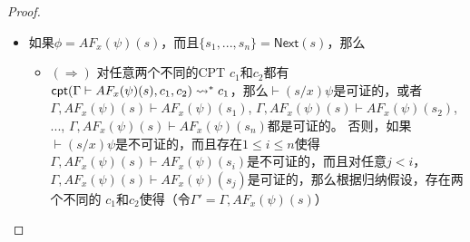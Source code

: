 {\begin{proof}
\begin{itemize}
\begin{itemize}
			$\textsf{cpt}(\vdash
			EX_x(\psi)(s), c_1, c_2)\rsa \\ 
			\textsf{cpt}(\vdash \psi_{s_1}, c_1,
			\textsf{cpt}(...\textsf{cpt}(\vdash\psi_{s_n}, c_1,
			c_2)...))\rsa^* \\ 
			\ldots \rsa^*\\
			\textsf{cpt}(\vdash\psi_{s_n}, c_1, c_2)\not\rsa^* c_1$。因此，由证明系统的规则可知，$\vdash EX_x(\psi)(s)$是可证的。
			\item $(\Leftarrow)$ 如果$\vdash EX_x(\psi)(s)$是可证的，那么由证明系统的规则可知，存在$1\le i\le n$使得$\vdash (s_i/x)\psi$是可证的。根据归纳假设，对任意两个不同的\textsf{CPT} $c_1$和$c_2$都有（我们用$\vdash\psi_{s_i}$表示$\vdash(s_i/x)\psi$） 
			
			$\textsf{cpt}(\vdash EX_x(\psi)(s), c_1, c_2)\rsa \\ 
			\textsf{cpt}(\vdash\psi_{s_1}, c_1,
			\textsf{cpt}(...\textsf{cpt}(\vdash\psi_{s_n}, c_1,
			c_2)...))\rsa^* \\ 
			\ldots\\
			\textsf{cpt}(\vdash\psi_{s_{i-1}}, c_1,
			\textsf{cpt}(...\textsf{cpt}(\vdash\psi_{s_n}, c_1,
			c_2)...))\rsa^*\\
			\textsf{cpt}(\vdash\psi_{s_i}, c_1,
			\textsf{cpt}(...\textsf{cpt}(\vdash\psi_{s_n}, c_1,
			c_2)...))\rsa^*c_1$。
		\end{itemize}
		
		\item 如果$\phi = AF_x(\psi)(s)$，而且$\{s_1,...,s_n\}=\textsf{Next}(s)$，那么
		\begin{itemize}
			\item $(\Rightarrow)$ 对任意两个不同的\textsf{CPT} $c_1$和$c_2$都有$\textsf{cpt}(\Gamma\vdash AF_x(\psi)(s), c_1, c_2)\rightsquigarrow^* c_1$，那么$\vdash(s/x)\psi$是可证的，或者$\Gamma, AF_x(\psi)(s)\vdash
			AF_x(\psi)(s_1)$, $\Gamma , AF_x(\psi)(s)\vdash AF_x(\psi)(s_2)$,
			$...$, $\Gamma , AF_x(\psi)(s)\vdash AF_x(\psi)(s_n)$都是可证的。
			否则，如果$\vdash(s/x)\psi$是不可证的，而且存在$1\le i\le n$使得$\Gamma,AF_x(\psi)(s)\vdash AF_x(\psi)(s_i)$是不可证的，而且对任意$j<i$，$\Gamma,AF_x(\psi)(s)\vdash AF_x(\psi)(s_j)$是可证的，那么根据归纳假设，存在两个不同的\CPT{} $c_1$和$c_2$使得（令$\Gamma'=\Gamma,AF_x(\psi)(s)$）
			

\end{itemize}
\end{itemize}
\end{proof}}

